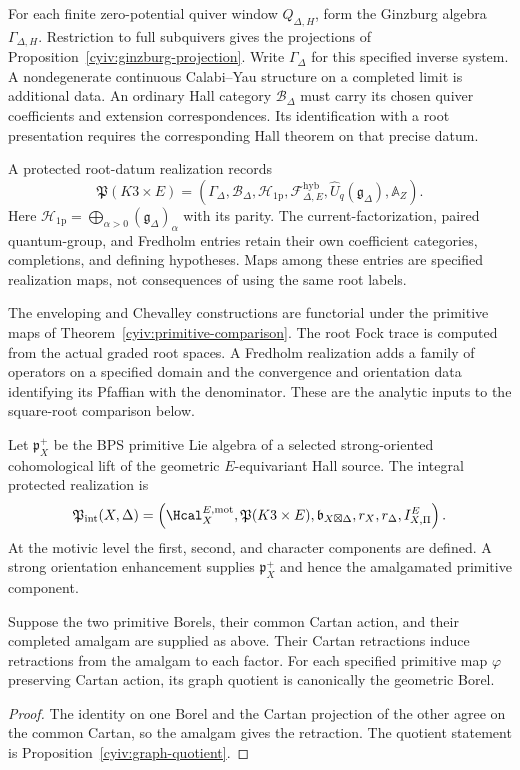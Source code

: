 For each finite zero-potential quiver window $Q_{\Delta,H}$, form the
Ginzburg algebra $\Gamma_{\Delta,H}$.
Restriction to full subquivers gives the projections of
Proposition~\ref{cyiv:ginzburg-projection}.
Write $\Gamma_\Delta$ for this specified inverse system.
A nondegenerate continuous Calabi--Yau structure on a completed limit
is additional data.
An ordinary Hall category $\mathcal B_\Delta$ must carry its chosen
quiver coefficients and extension correspondences.
Its identification with a root presentation requires the corresponding
Hall theorem on that precise datum.

\begin{definition}
A protected root-datum realization records
\[
 \mathfrak P(K3\times E)=
 (\Gamma_\Delta,\mathcal B_\Delta,\mathcal H_{\mathrm{1p}},
 \mathcal F^{\mathrm{hyb}}_{\Delta,E},\widehat U_q(\mathfrak g_\Delta),
 \mathbb A_Z).
\]
Here $\mathcal H_{\mathrm{1p}}=\bigoplus_{\alpha>0}(\mathfrak g_\Delta)_\alpha$
with its parity.
The current-factorization, paired quantum-group, and Fredholm entries
retain their own coefficient categories, completions, and defining
hypotheses.
Maps among these entries are specified realization maps, not consequences
of using the same root labels.
\end{definition}

The enveloping and Chevalley constructions are functorial under the
primitive maps of Theorem~\ref{cyiv:primitive-comparison}.
The root Fock trace is computed from the actual graded root spaces.
A Fredholm realization adds a family of operators on a specified domain
and the convergence and orientation data identifying its Pfaffian with
the denominator.
These are the analytic inputs to the square-root comparison below.

\begin{definition}
Let $\mathfrak p_X^+$ be the BPS primitive Lie algebra of a selected strong-oriented cohomological lift of the geometric $E$-equivariant Hall source.  The integral protected realization is
\[
 \mathfrak P_{\mathrm{int}}(X,\Delta)
 =\left(
   \Hcal_X^{E,\mathrm{mot}},
   \mathfrak P(K3\times E),
   \mathfrak b_{X\boxtimes\Delta},
   r_X,r_\Delta,
   I_{X,\Pi}^E
 \right).
\]
At the motivic level the first, second, and character components are defined.  A strong orientation enhancement supplies $\mathfrak p_X^+$ and hence the amalgamated primitive component.
\end{definition}

\begin{proposition}
Suppose the two primitive Borels, their common Cartan action, and their
completed amalgam are supplied as above.
Their Cartan retractions induce retractions from the amalgam to each
factor.
For each specified primitive map $\varphi$ preserving Cartan action,
its graph quotient is canonically the geometric Borel.
\end{proposition}
\begin{proof}
The identity on one Borel and the Cartan projection of the other agree
on the common Cartan, so the amalgam gives the retraction.
The quotient statement is Proposition~\ref{cyiv:graph-quotient}.
\end{proof}

